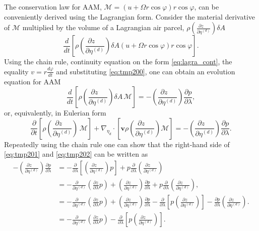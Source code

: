 \documentclass{agujournal}
\begin{document}
The conservation law for AAM, $\mathcal{M}=\left( u+\Omega r \cos \varphi \right) r \cos \varphi$, can be conveniently derived using the Lagrangian form. Consider the material derivative of $\mathcal{M}$ multiplied by the volume of a Lagrangian air parcel, $\rho \left( \frac{\partial z\quad }{\partial \eta^{(d)}}\right)\delta A$
\begin{equation}
\frac{d}{dt}\left[ \rho \left( \frac{\partial z\quad }{\partial \eta^{(d)}}\right) \delta A \left( u+\Omega r \cos \varphi \right) r \cos \varphi\right].
\end{equation}
Using the chain rule, continuity equation on the form \eqref{eq:lagra_cont}, the equality $v=r\frac{d\varphi}{dt}$ and substituting \eqref{eq:tmp200}, one can obtain an evolution equation for AAM
\begin{equation}
\frac{d}{dt}\left[ \rho \left( \frac{\partial z\quad }{\partial \eta^{(d)}}\right) \delta A\, \mathcal{M} \right]=- \left( \frac{\partial z\quad }{\partial \eta^{(d)}}\right) \frac{\partial p}{\partial \lambda},\label{eq:tmp201}
\end{equation}
or, equivalently, in Eulerian form
\begin{equation}
\frac{\partial}{\partial t}\left[ \rho \left( \frac{\partial z\quad }{\partial \eta^{(d)}}\right) \, \mathcal{M} \right]+\nabla_{\eta_d}\cdot \left[\mathbf{v} \rho \left( \frac{\partial z\quad }{\partial \eta^{(d)}}\right)  \mathcal{M} \right]=- \left( \frac{\partial z\quad }{\partial \eta^{(d)}}\right) \frac{\partial p}{\partial \lambda}.\label{eq:tmp202}
\end{equation}
Repeatedly using the chain rule one can show that the right-hand side of \eqref{eq:tmp201} and \eqref{eq:tmp202} can be written as
\begin{align}
- \left( \frac{\partial z\quad }{\partial \eta^{(d)}}\right)\frac{\partial p}{\partial \lambda}&=-\frac{\partial }{\partial \lambda}\left[  \left( \frac{\partial z\quad }{\partial \eta^{(d)}}\right) p\right]+p\frac{\partial }{\partial \lambda} \left( \frac{\partial z\quad }{\partial \eta^{(d)}}\right)\\ 
&=-\frac{\partial \quad}{\partial \eta^{(d)}}\left( \frac{\partial z}{\partial \lambda}p\right)+\left( \frac{\partial z\quad }{\partial \eta^{(d)}}\right)\frac{\partial p}{\partial \lambda}+p\frac{\partial }{\partial \lambda}\left( \frac{\partial z\quad }{\partial \eta^{(d)}}\right),\\
&=-\frac{\partial \quad}{\partial \eta^{(d)}}\left( \frac{\partial z}{\partial \lambda}p\right)+\left( \frac{\partial z\quad }{\partial \eta^{(d)}}\right)\frac{\partial p}{\partial \lambda}-\frac{\partial }{\partial \lambda}\left[ p\left( \frac{\partial z\quad }{\partial \eta^{(d)}}\right)\right]-\frac{\partial p}{\partial \lambda}\left( \frac{\partial z\quad }{\partial \eta^{(d)}}\right).\\
&=-\frac{\partial \quad}{\partial \eta^{(d)}}\left( \frac{\partial z}{\partial \lambda}p\right)-\frac{\partial }{\partial \lambda}\left[ p\left( \frac{\partial z\quad }{\partial \eta^{(d)}}\right)\right].\label{eq:tmp203}
\end{align}
\end{document}
